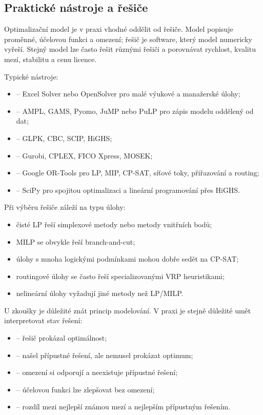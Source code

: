 \subsection{Praktické nástroje a řešiče}

Optimalizační model je v praxi vhodné oddělit od řešiče. Model popisuje proměnné, účelovou funkci a omezení;
řešič je software, který model numericky vyřeší. Stejný model lze často řešit různými řešiči a porovnávat
rychlost, kvalitu mezí, stabilitu a cenu licence.

Typické nástroje:
\begin{itemize}
    \item {} -- Excel Solver nebo OpenSolver pro malé výukové a manažerské úlohy;
    \item {} -- AMPL, GAMS, Pyomo, JuMP nebo PuLP pro zápis modelu oddělený od dat;
    \item {} -- GLPK, CBC, SCIP, HiGHS;
    \item {} -- Gurobi, CPLEX, FICO Xpress, MOSEK;
    \item {} -- Google OR-Tools pro LP, MIP, CP-SAT, síťové toky, přiřazování a routing;
    \item {} -- SciPy pro spojitou optimalizaci a lineární programování přes HiGHS.
\end{itemize}

Při výběru řešiče záleží na typu úlohy:
\begin{itemize}
    \item čisté LP řeší simplexové metody nebo metody vnitřních bodů;
    \item MILP se obvykle řeší branch-and-cut;
    \item úlohy s mnoha logickými podmínkami mohou dobře sedět na CP-SAT;
    \item routingové úlohy se často řeší specializovanými VRP heuristikami;
    \item nelineární úlohy vyžadují jiné metody než LP/MILP.
\end{itemize}

U zkoušky je důležité znát princip modelování. V praxi je stejně důležité umět interpretovat stav řešení:
\begin{itemize}
    \item {} -- řešič prokázal optimálnost;
    \item {} -- našel přípustné řešení, ale nemusel prokázat optimum;
    \item {} -- omezení si odporují a neexistuje přípustné řešení;
    \item {} -- účelovou funkci lze zlepšovat bez omezení;
    \item {} -- rozdíl mezi nejlepší známou mezí a nejlepším přípustným řešením.
\end{itemize}

